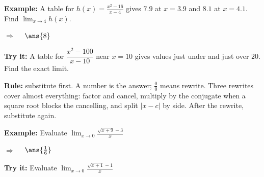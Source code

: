 \documentclass[12pt]{article}
\begin{document}
\begin{examplebox}
\textbf{Example:} \quad A table for $h(x) = \frac{x^2-16}{x-4}$ gives $7.9$ at
$x = 3.9$ and $8.1$ at $x = 4.1$. Find $\displaystyle\lim_{x \to 4} h(x)$.

$\Rightarrow\quad$ $\ans{8}$
\end{examplebox}

\begin{tryitbox}
\textbf{Try it:} \quad A table for $\dfrac{x^2-100}{x-10}$ near $x = 10$ gives
values just under and just over $20$. Find the exact limit.\\[2pt]
\end{tryitbox}


\begin{formulabox}
\textbf{Rule:} substitute first. A number is the answer; $\frac{0}{0}$ means
rewrite. Three rewrites cover almost everything: factor and cancel, multiply by
the conjugate when a square root blocks the cancelling, and split $|x - c|$ by
side. After the rewrite, substitute again.
\end{formulabox}

\begin{examplebox}
\textbf{Example:} \quad Evaluate $\displaystyle\lim_{x \to 0} \frac{\sqrt{x+9}-3}{x}$

$\Rightarrow\quad$ $\ans{\tfrac{1}{6}}$
\end{examplebox}

\begin{tryitbox}
\textbf{Try it:} \quad Evaluate $\displaystyle\lim_{x \to 0} \frac{\sqrt{x+1}-1}{x}$\\[2pt]
\end{tryitbox}
\end{document}
